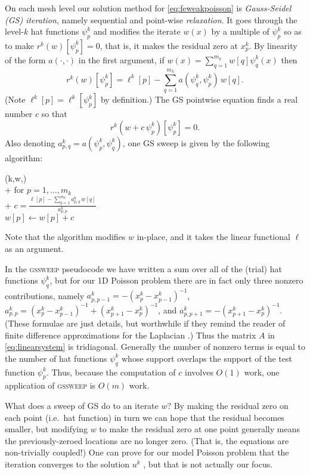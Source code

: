 \documentclass[letterpaper,final,12pt,reqno]{amsart}
\begin{document}
On each mesh level our solution method for \eqref{eq:feweakpoisson} is \emph{Gauss-Seidel (GS) iteration}, namely sequential and point-wise \emph{relaxation}.  It goes through the level-$k$ hat functions $\psi_p^k$ and modifies the iterate $w(x)$ by a multiple of $\psi_p^k$ so as to make $r^k(w)[\psi_p^k]=0$, that is, it makes the residual zero at $x_p^k$.  By linearity of the form $a(\cdot,\cdot)$ in the first argument, if $w(x) = \sum_{q=1}^{m_k} w[q] \psi_q^k(x)$ then
\begin{equation}
  r^k(w)[\psi_p^k] = \ell^k[p] - \sum_{q=1}^{m_k} a(\psi_q^k,\psi_p^k)\, w[q].  \label{eq:residualpoisson}
\end{equation}
(Note $\ell^k[p] = \ell^k[\psi_p^k]$ by definition.)  The GS pointwise equation finds a real number $c$ so that
\begin{equation}
  r^k(w+c\,\psi_p^k)[\psi_p^k] = 0.  \label{eq:gaussseidelpoint}
\end{equation}
Also denoting $a_{p,q}^k = a(\psi_p^k,\psi_q^k)$, one GS sweep is given by the following algorithm:
\begin{pseudo*}
(k,w,\ell)\text{:} \\+
    for $p=1,\dots,m_k$ \\+
        $\displaystyle c=\frac{\ell[p] - \sum_{q=1}^{m_k} a_{p,q}^k \,w[q]}{a_{p,p}^k}$ \\
        $w[p] \gets w[p] + c$
\end{pseudo*}
Note that the algorithm modifies $w$ in-place, and it takes the linear functional $\ell$ as an argument.

In the \textsc{gssweep} pseudocode we have written a sum over all of the (trial) hat functions $\psi_q^k$, but for our 1D Poisson problem there are in fact only three nonzero contributions, namely $a_{p,p-1}^k = -(x_p^k-x_{p-1}^k)^{-1}$, $a_{p,p}^k = (x_p^k-x_{p-1}^k)^{-1} + (x_{p+1}^k-x_p^k)^{-1}$, and $a_{p,p+1}^k = -(x_{p+1}^k-x_p^k)^{-1}$.  (These formulae are just details, but worthwhile if they remind the reader of finite difference approximations for the Laplacian \cite[for example]{Bueler2021}.)  Thus the matrix $A$ in \eqref{eq:linearsystem} is tridiagonal.  Generally the number of nonzero terms is equal to the number of hat functions $\psi_q^k$ whose support overlaps the support of the test function $\psi_p^k$.  Thus, because the computation of $c$ involves $O(1)$ work, one application of \textsc{gssweep} is $O(m)$ work.

What does a sweep of GS do to an iterate $w$?  By making the residual zero on each point (i.e.~hat function) in turn we can hope that the residual becomes smaller, but modifying $w$ to make the residual zero at one point generally means the previously-zeroed locations are no longer zero.  (That is, the equations are non-trivially coupled!)  One can prove for our model Poisson problem that the iteration converges to the solution $u^k$ \cite[for example]{Greenbaum1997}, but that is not actually our focus.
\end{document}
